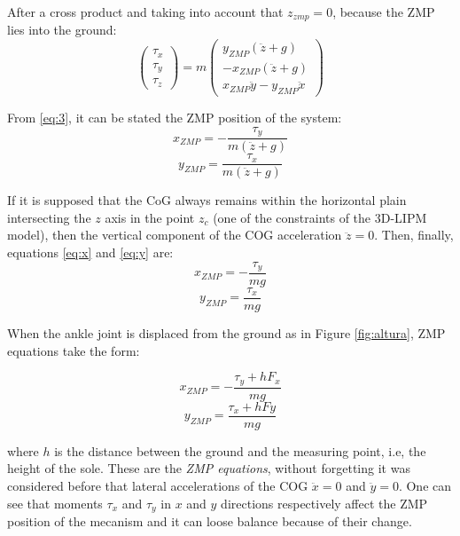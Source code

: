 After a cross product and taking into account that $z_{zmp} = 0$, because the ZMP lies into the ground:
\begin{equation}
\begin{pmatrix}
\tau_x \\
\tau_y \\
\tau_z 
\end{pmatrix} 
= m
\begin{pmatrix}
y_{ZMP}(\ddot{z}+g) \\
-x_{ZMP}(\ddot{z}+g) \\
x_{ZMP}\ddot{y}-y_{ZMP}\ddot{x}
\end{pmatrix}
\label{eq:3}
\end{equation}

From \eqref{eq:3}, it can be stated the ZMP position of the system:
\begin{equation}
x_{ZMP} = -\frac{\tau_y}{m(\ddot{z}+g)}
\label{eq:x}
\end{equation}
\begin{equation}
y_{ZMP} = \frac{\tau_x}{m(\ddot{z}+g)}
\label{eq:y}
\end{equation}

If it is supposed that the CoG always remains within the horizontal plain intersecting the $z$ axis in the point $z_c$ (one of the constraints of the 3D-LIPM model), then the vertical component of the COG acceleration $\ddot{z}=0$. Then, finally, equations \eqref{eq:x} and \eqref{eq:y} are:
\begin{equation}
x_{ZMP} = -\frac{\tau_y}{mg}
\label{eq:xzmp}
\end{equation}
\begin{equation}
y_{ZMP} = \frac{\tau_x}{mg}
\label{eq:yzmp}
\end{equation}

When the ankle joint is displaced from the ground as in Figure \ref{fig:altura}, ZMP equations take the form:

\begin{equation}
x_{ZMP} = -\frac{\tau_y+hF_x}{mg}
\label{eq:xzmp}
\end{equation}
\begin{equation}
y_{ZMP} = \frac{\tau_x+hFy}{mg}
\label{eq:yzmp}
\end{equation}

where $h$ is the distance between the ground and the measuring point, i.e, the height of the sole. 
These are the \textit{ZMP equations}, without forgetting it was considered before that lateral accelerations of the COG $\ddot{x}=0$ and $\ddot{y}=0$. One can see that moments $\tau_x$ and $\tau_y$ in $x$ and $y$ directions respectively affect the ZMP position of the mecanism and it can loose balance because of their change.

